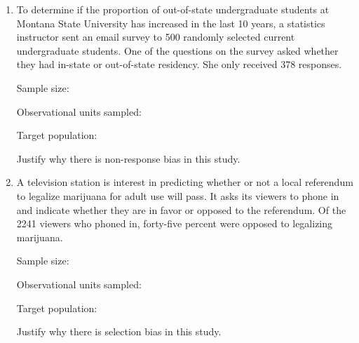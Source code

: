 \documentclass[
]{report}
\begin{document}
\begin{enumerate}
\def\labelenumi{\arabic{enumi}.}
\setcounter{enumi}{10}
\item
  To determine if the proportion of out-of-state undergraduate students at Montana State University has increased in the last 10 years, a statistics instructor sent an email survey to 500 randomly selected current undergraduate students. One of the questions on the survey asked whether they had in-state or out-of-state residency. She only received 378 responses.
  \vspace{0.1in}

  Sample size:
  \vspace{0.3in}

  Observational units sampled:
  \vspace{0.3in}

  Target population:
  \vspace{0.3in}

  Justify why there is non-response bias in this study.
  \vspace{0.5in}
\item
  A television station is interest in predicting whether or not a local referendum to legalize marijuana for adult use will pass. It asks its viewers to phone in and indicate whether they are in favor or opposed to the referendum. Of the 2241 viewers who phoned in, forty-five percent were opposed to legalizing marijuana.
  \vspace{0.1in}

  Sample size:
  \vspace{0.3in}

  Observational units sampled:
  \vspace{0.3in}

  Target population:
  \vspace{0.3in}

  Justify why there is selection bias in this study.
  \vspace{0.5in}
\end{enumerate}

\newpage
\end{document}
